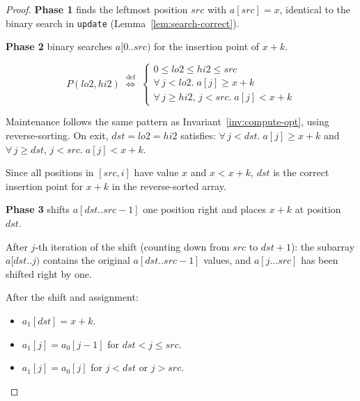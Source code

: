 \begin{proof}
\textbf{Phase 1} finds the leftmost position $\mathit{src}$ with $a[\mathit{src}] = x$,
identical to the binary search in \texttt{update} (Lemma~\ref{lem:search-correct}).

\textbf{Phase 2} binary searches $a[0..\mathit{src})$ for the insertion point of $x+k$.

\begin{invariant}[Phase 2]\label{inv:phase2}
\[
  P(\mathit{lo2}, \mathit{hi2}) \;\stackrel{\text{def}}{\iff}\;
  \begin{cases}
    0 \leq \mathit{lo2} \leq \mathit{hi2} \leq \mathit{src} \\
    \forall\, j < \mathit{lo2}.\; a[j] \geq x + k \\
    \forall\, j \geq \mathit{hi2},\, j < \mathit{src}.\; a[j] < x + k
  \end{cases}
\]
\end{invariant}

Maintenance follows the same pattern as Invariant~\ref{inv:compute-opt}, using
reverse-sorting. On exit, $\mathit{dst} = \mathit{lo2} = \mathit{hi2}$ satisfies:
$\forall\, j < \mathit{dst}.\; a[j] \geq x + k$ and
$\forall\, j \geq \mathit{dst},\, j < \mathit{src}.\; a[j] < x + k$.

Since all positions in $[\mathit{src}, i]$ have value $x$ and $x < x + k$,
$\mathit{dst}$ is the correct insertion point for $x + k$ in the reverse-sorted array.

\textbf{Phase 3} shifts $a[\mathit{dst}..\mathit{src}{-}1]$ one position right
and places $x+k$ at position $\mathit{dst}$.

\begin{invariant}\label{inv:shift}
After $j$-th iteration of the shift (counting down from $\mathit{src}$ to $\mathit{dst}+1$):
the subarray $a[\mathit{dst}..j)$ contains the original $a[\mathit{dst}..\mathit{src}{-}1]$
values, and $a[j...\mathit{src}]$ has been shifted right by one.
\end{invariant}

After the shift and assignment:
\begin{itemize}
  \item $a_1[\mathit{dst}] = x + k$.
  \item $a_1[j] = a_0[j-1]$ for $\mathit{dst} < j \leq \mathit{src}$.
  \item $a_1[j] = a_0[j]$ for $j < \mathit{dst}$ or $j > \mathit{src}$.
\end{itemize}


\end{proof}
